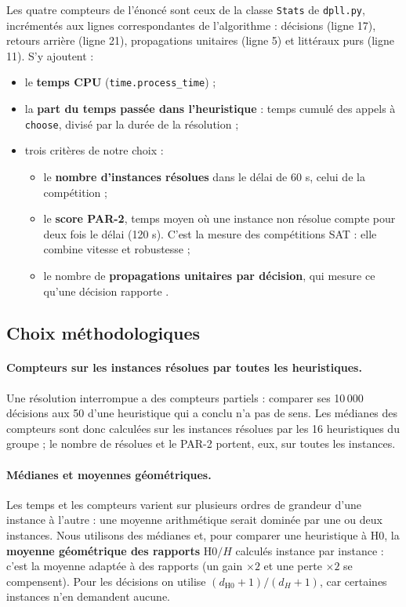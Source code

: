 \documentclass[11pt,a4paper]{article}
\begin{document}
Les quatre compteurs de l'énoncé sont ceux de la classe \texttt{Stats}
de \texttt{dpll.py}, incrémentés aux lignes correspondantes de
l'algorithme : décisions (ligne 17), retours arrière (ligne 21),
propagations unitaires (ligne 5) et littéraux purs (ligne 11). S'y ajoutent :
\begin{itemize}
  \item le \textbf{temps CPU} (\texttt{time.process\_time}) ;
  \item la \textbf{part du temps passée dans l'heuristique} : temps cumulé
    des appels à \texttt{choose}, divisé par la durée de la résolution ;
  \item trois critères de notre choix :
    \begin{itemize}
      \item le \textbf{nombre d'instances résolues} dans le délai de 60 s,
        celui de la compétition ;
      \item le \textbf{score PAR-2}, temps moyen où une instance non résolue
        compte pour deux fois le délai (120 s). C'est la mesure des
        compétitions SAT : elle combine vitesse et robustesse ;
      \item le nombre de \textbf{propagations unitaires par décision},
        qui mesure ce qu'une décision \og rapporte \fg{}.
    \end{itemize}
\end{itemize}

\subsection{Choix méthodologiques}

\paragraph{Compteurs sur les instances résolues par toutes les
heuristiques.} Une résolution interrompue a des compteurs partiels :
comparer ses 10\,000 décisions aux 50 d'une heuristique qui a conclu n'a pas
de sens. Les médianes des compteurs sont donc calculées sur les instances
résolues par les 16 heuristiques du groupe ; le nombre de résolues et le
PAR-2 portent, eux, sur toutes les instances.

\paragraph{Médianes et moyennes géométriques.} Les temps et les compteurs
varient sur plusieurs ordres de grandeur d'une instance à l'autre : une
moyenne arithmétique serait dominée par une ou deux instances. Nous
utilisons des médianes et, pour comparer une heuristique à H0, la
\textbf{moyenne géométrique des rapports} $\text{H0}/H$ calculés instance par
instance : c'est la moyenne adaptée à des rapports (un gain $\times 2$ et une
perte $\times 2$ se compensent). Pour les décisions on utilise
$(d_{\text{H0}}+1)/(d_H+1)$, car certaines instances n'en demandent aucune.
\end{document}
